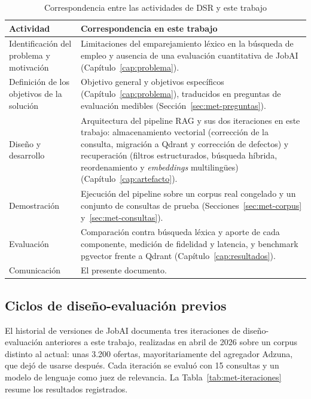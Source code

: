 \begin{table}[htbp!]
    \centering
    \caption{Correspondencia entre las actividades de DSR \citep{Peffers2007} y este trabajo}
    \label{tab:met-peffers}
    \begin{tabular}{|p{4.2cm}|p{10cm}|}
        \hline
        \textbf{Actividad} & \textbf{Correspondencia en este trabajo} \\
        \hline
        Identificación del problema y motivación & Limitaciones del emparejamiento léxico en la búsqueda de empleo y ausencia de una evaluación cuantitativa de JobAI (Capítulo~\ref{cap:problema}). \\
        \hline
        Definición de los objetivos de la solución & Objetivo general y objetivos específicos (Capítulo~\ref{cap:problema}), traducidos en preguntas de evaluación medibles (Sección~\ref{sec:met-preguntas}). \\
        \hline
        Diseño y desarrollo & Arquitectura del pipeline RAG y sus dos iteraciones en este trabajo: almacenamiento vectorial (corrección de la consulta, migración a Qdrant y corrección de defectos) y recuperación (filtros estructurados, búsqueda híbrida, reordenamiento y \textit{embeddings} multilingües) (Capítulo~\ref{cap:artefacto}). \\
        \hline
        Demostración & Ejecución del pipeline sobre un corpus real congelado y un conjunto de consultas de prueba (Secciones~\ref{sec:met-corpus} y~\ref{sec:met-consultas}). \\
        \hline
        Evaluación & Comparación contra búsqueda léxica y aporte de cada componente, medición de fidelidad y latencia, y benchmark pgvector frente a Qdrant (Capítulo~\ref{cap:resultados}). \\
        \hline
        Comunicación & El presente documento. \\
        \hline
    \end{tabular}
\end{table}

\subsection{Ciclos de diseño-evaluación previos}
\label{sec:met-ciclos-previos}

El historial de versiones de JobAI documenta tres iteraciones de diseño-evaluación anteriores a este trabajo, realizadas en abril de 2026 sobre un corpus distinto al actual: unas 3.200 ofertas, mayoritariamente del agregador Adzuna, que dejó de usarse después. Cada iteración se evaluó con 15 consultas y un modelo de lenguaje como juez de relevancia. La Tabla~\ref{tab:met-iteraciones} resume los resultados registrados.

